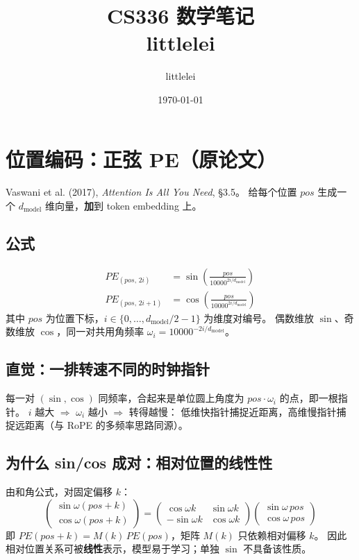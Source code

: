 \documentclass[12pt]{ctexart}
\title{CS336 数学笔记\\\large littlelei}
\author{littlelei}
\date{\today}
\begin{document}
\maketitle


\section{位置编码：正弦 PE（原论文）}

Vaswani et al. (2017), \emph{Attention Is All You Need}, \S3.5。
给每个位置 $pos$ 生成一个 $d_{\text{model}}$ 维向量，\textbf{加}到 token embedding 上。

\subsection{公式}
\begin{align}
PE_{(pos,\,2i)}   &= \sin\!\left(\frac{pos}{10000^{2i/d_{\text{model}}}}\right) \\
PE_{(pos,\,2i+1)} &= \cos\!\left(\frac{pos}{10000^{2i/d_{\text{model}}}}\right)
\end{align}
其中 $pos$ 为位置下标，$i \in \{0,\dots,d_{\text{model}}/2-1\}$ 为维度对编号。
偶数维放 $\sin$、奇数维放 $\cos$，同一对共用角频率
$\omega_i = 10000^{-2i/d_{\text{model}}}$。

\subsection{直觉：一排转速不同的时钟指针}
每一对 $(\sin,\cos)$ 同频率，合起来是单位圆上角度为 $pos\cdot\omega_i$ 的点，即一根指针。
$i$ 越大 $\Rightarrow$ $\omega_i$ 越小 $\Rightarrow$ 转得越慢：
低维快指针捕捉近距离，高维慢指针捕捉远距离（与 RoPE 的多频率思路同源）。

\subsection{为什么 sin/cos 成对：相对位置的线性性}
由和角公式，对固定偏移 $k$：
\[
\begin{pmatrix}\sin\omega(pos+k)\\ \cos\omega(pos+k)\end{pmatrix}
=
\begin{pmatrix}\cos\omega k & \sin\omega k\\ -\sin\omega k & \cos\omega k\end{pmatrix}
\begin{pmatrix}\sin\omega\,pos\\ \cos\omega\,pos\end{pmatrix}
\]
即 $PE(pos+k) = M(k)\,PE(pos)$，矩阵 $M(k)$ 只依赖相对偏移 $k$。
因此相对位置关系可被\textbf{线性}表示，模型易于学习；单独 $\sin$ 不具备该性质。
\end{document}
